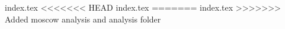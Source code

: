 {index.tex}
<<<<<<< HEAD
{index.tex}
=======
{index.tex}
>>>>>>> Added moscow analysis and analysis folder
